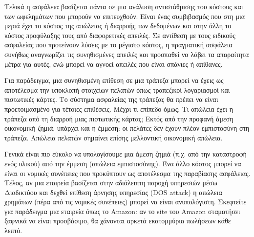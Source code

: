 Τελικά η ασφάλεια βασίζεται πάντα σε μια ανάλυση αντιστάθμισης του κόστους και των ωφελημάτων που μπορούν να επιτευχθούν. Είναι ένας συμβιβασμός που στη μια μεριά έχει το κόστος της απώλειας ή διαρροής των δεδομένων και στην άλλη το κόστος προφύλαξης τους από διαφορετικές απειλές. Σε αντίθεση με τους ειδικούς ασφαλείας που προτείνουν λύσεις με το μέγιστο κόστος, η πραγματική ασφάλεια συνήθως αναγνωρίζει τις συνηθισμένες απειλές και προσπαθεί να λάβει τα απαραίτητα μέτρα για αυτές, ενώ μπορεί να αγνοεί απειλές που είναι σπάνιες ή απίθανες.

Για παράδειγμα, μια συνηθισμένη επίθεση σε μια τράπεζα μπορεί να έχεις ως αποτέλεσμα την υποκλοπή στοιχείων πελατών όπως τραπεζικοί λογαριασμοί και πιστωτικές κάρτες. Το σύστημα ασφαλείας της τράπεζας θα πρέπει να είναι προετοιμασμένο για τέτοιες επιθέσεις. Μέχρι τι επίπεδο όμως; Τι απώλεια έχει η τράπεζα από τη διαρροή μιας πιστωτικής κάρτας; Εκτός από την προφανή άμεση οικονομική ζημιά, υπάρχει και η έμμεση: οι πελάτες δεν έχουν πλέον εμπιστοσύνη στη τράπεζα. Απώλεια πελατών σημαίνει επίσης μελλοντική οικονομική απώλεια. 

Γενικά είναι πιο εύκολο να υπολογίσουμε μια άμεση ζημιά  (π.χ. από την καταστροφή ενός υλικού) από την έμμεση (απώλεια εμπιστοσύνης). Ένα άλλο κόστος μπορεί να είναι οι νομικές συνέπειες που προκύπτουν ως αποτέλεσμα της παραβίασης ασφάλειας. Τέλος, αν μια εταιρεία βασίζεται στην αδιάλειπτη παροχή υπηρεσιών μέσω Διαδικτύου και δεχθεί επίθεση άρνησης υπηρεσίας (DOS attack) η απώλεια χρημάτων (πέρα από τις νομικές συνέπειες) μπορεί να είναι ανυπολόγιστη. Σκεφτείτε για παράδειγμα μια εταιρεία όπως το Amazon: αν το site του Amazon σταματήσει ξαφνικά να είναι προσβάσιμο, θα χάνονται αρκετά εκατομμύρια πωλήσεων κάθε λεπτό.
 


